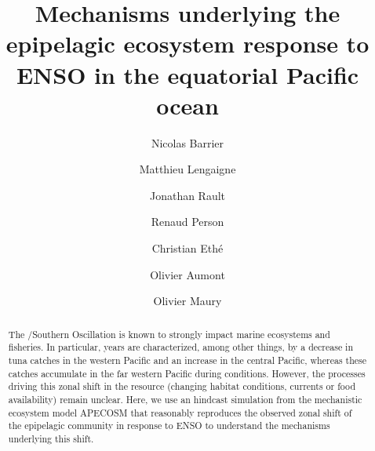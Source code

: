 \documentclass[review, 12pt]{elsarticle}
\begin{document}
\begin{frontmatter}

\title{Mechanisms underlying the epipelagic ecosystem response to ENSO in the equatorial Pacific ocean}

\author[mymainaddress]{Nicolas Barrier}

\author[mymainaddress]{Matthieu Lengaigne}
\author[mymainaddress]{Jonathan Rault}
\author[renaud]{Renaud Person}
\author[chris]{Christian Eth\'{e}}
\author[renaud]{Olivier Aumont}
\author[mymainaddress]{Olivier Maury}


\address[mymainaddress]{MARBEC, Univ. Montpellier, CNRS, Ifremer, IRD, Sète, France}
\address[renaud]{LOCEAN, IRD}
\address[chris]{IPSL, CNRS}

\begin{abstract}

The \nino{}/Southern Oscillation is known to strongly impact marine ecosystems and fisheries. In particular, \nino{} years are characterized, among other things, by a decrease in tuna catches in the western Pacific and an increase in the central Pacific, whereas these catches accumulate in the far western Pacific during \nina{} conditions. However, the processes driving this zonal shift in the resource (changing habitat conditions, currents or food availability) remain unclear. Here, we use an hindcast simulation from the mechanistic ecosystem model APECOSM that reasonably reproduces the observed zonal shift of the epipelagic community in response to ENSO to understand the mechanisms underlying this shift.



\end{abstract}
\end{frontmatter}
\end{document}

